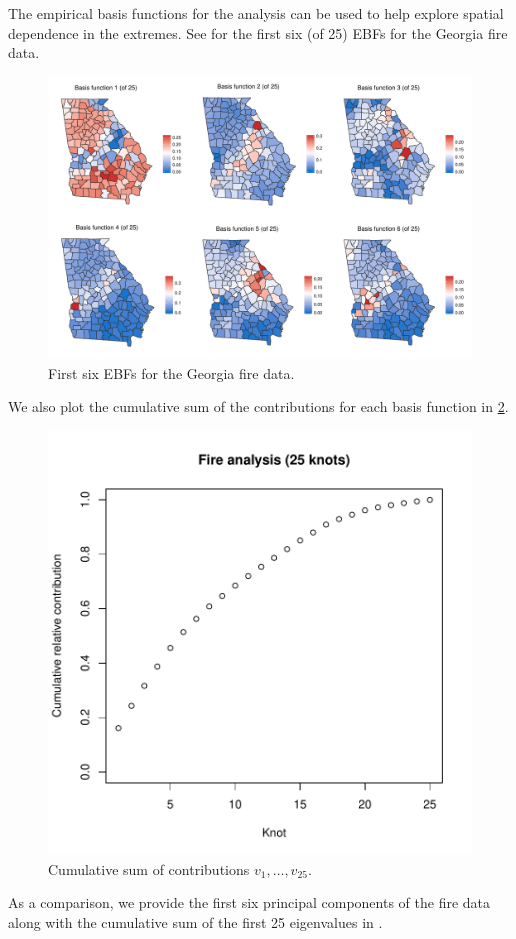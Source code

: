 \documentclass[11pt]{article}
\begin{document}
The empirical basis functions for the analysis can be used to help explore spatial dependence in the extremes.
See  for the first six (of 25) EBFs for the Georgia fire data.
\begin{figure}[htbp] %
  \centering
  \includegraphics[width=\linewidth]{plots/fire-ebf-panel.pdf}
  \caption{First six EBFs for the Georgia fire data.}
  \label{ebfig:fire-ebfpanel}
\end{figure}
We also plot the cumulative sum of the contributions for each basis function in \ref{ebfig:fire-v25}.
\begin{figure}[htbp] %
  \centering
  \includegraphics[width=0.5\linewidth]{plots/firev-25.pdf}
  \caption{Cumulative sum of contributions $v_1, \ldots, v_25$.}
  \label{ebfig:fire-v25}
\end{figure}
As a comparison, we provide the first six principal components of the fire data along with the cumulative sum of the first 25 eigenvalues in .
\end{document}
